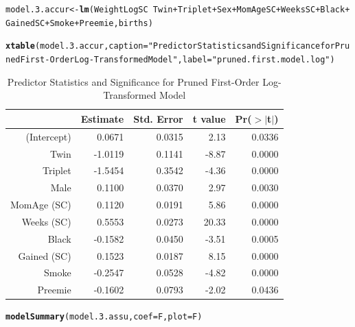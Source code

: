 \documentclass{article}\usepackage[]{graphicx}\usepackage[]{xcolor}
\makeatletter
\newcommand{\hlstr}[1]{\textcolor[rgb]{0.192,0.494,0.8}{#1}}%
\newcommand{\hlopt}[1]{\textcolor[rgb]{0,0,0}{#1}}%
\newcommand{\hlstd}[1]{\textcolor[rgb]{0.345,0.345,0.345}{#1}}%
\newcommand{\hlkwb}[1]{\textcolor[rgb]{0.69,0.353,0.396}{#1}}%
\newcommand{\hlkwc}[1]{\textcolor[rgb]{0.333,0.667,0.333}{#1}}%
\newcommand{\hlkwd}[1]{\textcolor[rgb]{0.737,0.353,0.396}{\textbf{#1}}}%
\newenvironment{kframe}{%
 \def\at@end@of@kframe{}%
 \ifinner\ifhmode%
  \def\at@end@of@kframe{\end{minipage}}%
  \begin{minipage}{\columnwidth}%
 \fi\fi%
 \def\FrameCommand##1{\hskip\@totalleftmargin \hskip-\fboxsep
 \colorbox{shadecolor}{##1}\hskip-\fboxsep
     \hskip-\linewidth \hskip-\@totalleftmargin \hskip\columnwidth}%
 \MakeFramed {\advance\hsize-\width
   \@totalleftmargin\z@ \linewidth\hsize
   \@setminipage}}%
 {\par\unskip\endMakeFramed%
 \at@end@of@kframe}
\newenvironment{knitrout}{}{} %
\makeatother
\begin{document}
\begin{knitrout}
\color{fgcolor}\begin{kframe}
\begin{alltt}
\hlstd{model.3.accur} \hlkwb{<-} \hlkwd{lm}\hlstd{(WeightLogSC} \hlopt{~} \hlstd{Twin} \hlopt{+} \hlstd{Triplet} \hlopt{+} \hlstd{Sex} \hlopt{+} \hlstd{MomAgeSC} \hlopt{+} \hlstd{WeeksSC} \hlopt{+} \hlstd{Black} \hlopt{+}
                      \hlstd{GainedSC} \hlopt{+} \hlstd{Smoke} \hlopt{+} \hlstd{Preemie, births)}

\hlkwd{xtable}\hlstd{(model.3.accur,} \hlkwc{caption}\hlstd{=}\hlstr{"Predictor Statistics and Significance for Pruned First-Order Log-Transformed Model"}\hlstd{,} \hlkwc{label}\hlstd{=}\hlstr{"pruned.first.model.log"}\hlstd{)}
\end{alltt}
\end{kframe}
\end{knitrout}
\begin{table}[ht]
\centering
\begin{tabular}{rrrrr}
  \hline
 & Estimate & Std. Error & t value & Pr($>$$|$t$|$) \\ 
  \hline
(Intercept) & 0.0671 & 0.0315 & 2.13 & 0.0336 \\ 
  Twin & -1.0119 & 0.1141 & -8.87 & 0.0000 \\ 
  Triplet & -1.5454 & 0.3542 & -4.36 & 0.0000 \\ 
  Male & 0.1100 & 0.0370 & 2.97 & 0.0030 \\ 
  MomAge (SC) & 0.1120 & 0.0191 & 5.86 & 0.0000 \\ 
  Weeks (SC) & 0.5553 & 0.0273 & 20.33 & 0.0000 \\ 
  Black & -0.1582 & 0.0450 & -3.51 & 0.0005 \\ 
  Gained (SC) & 0.1523 & 0.0187 & 8.15 & 0.0000 \\ 
  Smoke & -0.2547 & 0.0528 & -4.82 & 0.0000 \\ 
  Preemie & -0.1602 & 0.0793 & -2.02 & 0.0436 \\ 
   \hline
\end{tabular}
\caption{Predictor Statistics and Significance for Pruned First-Order Log-Transformed Model} 
\label{pruned.first.model.log}
\end{table}

\begin{knitrout}
\color{fgcolor}\begin{kframe}
\begin{alltt}
\hlkwd{modelSummary}\hlstd{(model.3.assu,} \hlkwc{coef}\hlstd{=F,} \hlkwc{plot}\hlstd{=F)}
\end{alltt}
\end{kframe}
\end{knitrout}
\end{document}
